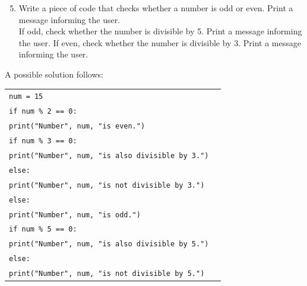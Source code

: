 \documentclass[t,handout,9pt]{beamer}
\begin{document}
%
\begin{frame}
\vfill
\begin{enumerate}
\setcounter{enumi}{4}
	\item Write a piece of code that checks whether a number is odd or even. Print a message informing the user.\\If odd, check whether the number is divisible by 5. Print a message informing the user. If even, check whether the number is divisible by 3. Print a message informing the user.
\end{enumerate}
A possible solution follows:
\begin{table}[]
	\begin{tabular}{ll}
	\texttt{num = 15} & \\
	\texttt{if num \% 2 == 0:} & \\
	\texttt{\qquad print("Number", num, "is even.")} & \\
	\texttt{\qquad if num \% 3 == 0:} & \\
	\texttt{\qquad\qquad print("Number", num, "is also divisible by 3.")} & \\
	\texttt{\qquad else:} & \\
	\texttt{\qquad\qquad print("Number", num, "is not divisible by 3.")} & \\
	\texttt{else:} & \\
	\texttt{\qquad print("Number", num, "is odd.")} & \\
	\texttt{\qquad if num \% 5 == 0:} & \\
	\texttt{\qquad\qquad print("Number", num, "is also divisible by 5.")} & \\
	\texttt{\qquad else:} & \\
	\texttt{\qquad\qquad print("Number", num, "is not divisible by 5.")} & \\
	\end{tabular}
	\end{table}
\vfill
\end{frame}
%
\end{document}
